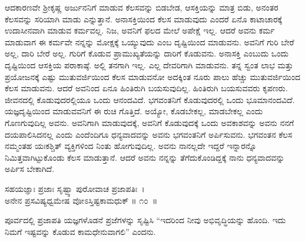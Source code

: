 ಆದಕಾರಣವೇ ಶ‍್ರೀಕೃಷ್ಣ ಅರ್ಜುನನಿಗೆ ಮಾಡುವ ಕೆಲಸವನ್ನು ಬಿಡಬೇಡ, ಆಸಕ್ತಿಯನ್ನು ಮಾತ್ರ ಬಿಡು, ಅನಂತರ ಕೆಲಸವನ್ನು ಸರಿಯಾಗಿ ಮಾಡು ಎನ್ನುತ್ತಾನೆ. ಅನಾಸಕ್ತಿಯಿಂದ ಕೆಲಸ ಮಾಡುವುದು ಎಂದರೆ ಏನೊ ಕಾಟಾಚಾರಕ್ಕೆ ಉದಾಸೀನವಾಗಿ ಮಾಡುವ ಕರ್ಮವಲ್ಲ. ನಿಜ, ಅವನಿಗೆ ಫಲದ ಮೇಲೆ ಅಪೇಕ್ಷೆ ಇಲ್ಲ. ಆದರೆ ಅವನು ಕರ್ಮ ಮಾಡುವಾಗ ಈ ಕರ್ಮವೇ ನನ್ನನ್ನು ಮೋಕ್ಷಕ್ಕೆ ಒಯ್ಯುವುದು ಎಂಬ ದೃಷ್ಟಿಯಿಂದ ಮಾಡುವನು. ಅವನಿಗೆ ಗುರಿ ಬೇರೆ ಅಲ್ಲ, ದಾರಿ ಬೇರೆ ಅಲ್ಲ. ಗುರಿಗೆ ಕೊಡುವ ಪ್ರಾಮುಖ್ಯತೆಯನ್ನು ದಾರಿಗೆ ಕೊಡುವನು. ಅನಾಸಕ್ತಿ ಎಂಬುದು ಒಂದು ದೃಷ್ಟಿಯಿಂದ ಆಸಕ್ತಿಯ ಪರಾಕಾಷ್ಠೆ. ಅಲ್ಲಿ ತನಗಾಗಿ ಇಲ್ಲ. ಎಲ್ಲ ದೇವರಿಗಾಗಿ ಮಾಡುವನು. ತನ್ನ ಸ್ವಂತ ಲಾಭ ಮತ್ತು ಪ್ರಯೋಜನಕ್ಕೆ ಎಷ್ಟು ಮುತುವರ್ಜಿಯಿಂದ ಕೆಲಸ ಮಾಡುವನೋ ಅದಕ್ಕಿಂತ ನೂರು ಪಾಲು ಹೆಚ್ಚು ಮುತುವರ್ಜಿಯಿಂದ ಕೆಲಸ ಮಾಡುವನು. ಆದರೆ ಅವನಿಂದ ಏನೂ ಹಿಂತಿರುಗಿ ಬಯಸುವುದಿಲ್ಲ. ಹಿಂತಿರುಗಿ ಬಯಸುವವರು ಕೃಪಣರು. ಜೀವನದಲ್ಲಿ ಕೊಡುವುದರಲ್ಲಿಯೂ ಒಂದು ಆನಂದವಿದೆ. ಭಗವಂತನಿಗೆ ಕೊಡುವುದರಲ್ಲಿ ಒಂದು ಭೂಮಾನಂದವಿದೆ. ಯಜ್ಞದೃಷ್ಟಿಯಿಂದ ಮಾಡುವವನಿಗೆ ಈ ರುಚಿ ಗೊತ್ತಿದೆ. ಅಯ್ಯೋ, ಕೊಡಬೇಕಲ್ಲ, ಮಾಡಬೇಕಲ್ಲ ಎಂದು ಗೊಣಗುವುದಿಲ್ಲ ಅವನು. ಅವನಿಗಾಗಿ ಮಾಡುವುದಕ್ಕೆ, ಅವನಿಗೆ ಕೊಡುವುದಕ್ಕೆ ಒಂದು ಅವಕಾಶವನ್ನು ಅವನು ನನಗೆ ದಯಪಾಲಿಸಿದನಲ್ಲ ಎಂದು ಎಂದೆಂದಿಗೂ ಧನ್ಯವಾದವನ್ನು ಅವನು ಭಗವಂತನಿಗೆ ಅರ್ಪಿಸುವನು. ಭಗವಂತನ ಕೆಲಸ ನಮ್ಮಂತಹ ಯಃಕಶ್ಚಿತ್ ವ್ಯಕ್ತಿಗಳಿಂದ ನಿಂತು ಹೋಗುವುದಿಲ್ಲ. ಅವನು ನಾನಲ್ಲದೇ ಇದ್ದರೆ ಇನ್ನಾರನ್ನೊ ನಿಮಿತ್ತವಾಗಿಟ್ಟುಕೊಂಡು ಕೆಲಸ ಮಾಡುತ್ತಾನೆ. ಆದರೆ ಅವನು ನನ್ನನ್ನು ತೆಗೆದುಕೊಂಡಿದ್ದಕ್ಕೆ ನಾನು ಧನ್ಯವಾದವನ್ನು ಅರ್ಪಿಸ ಬೇಕಾಗಿದೆ.

\begin{shloka}
ಸಹಯಜ್ಞಾಃ ಪ್ರಜಾಃ ಸೃಷ್ಟ್ವಾ ಪುರೋವಾಚ ಪ್ರಜಾಪತಿಃ~।\\ಅನೇನ ಪ್ರಸವಿಷ್ಯಧ್ವಮೇಷ ವೋಽಸ್ತಿಷ್ಟಕಾಮಧುಕ್ \hfill॥ ೧೦~॥
\end{shloka}

\begin{artha}
ಪೂರ್ವದಲ್ಲಿ ಪ್ರಜಾಪತಿ ಯಜ್ಞಗಳೊಡನೆ ಪ್ರಜೆಗಳನ್ನು ಸೃಷ್ಟಿಸಿ “ಇದರಿಂದ ನೀವು ಅಭಿವೃದ್ಧಿಯನ್ನು ಹೊಂದಿ. ಇದು ನಿಮಗೆ ಇಷ್ಟವನ್ನು ಕೊಡುವ ಕಾಮಧೇನುವಾಗಲಿ” ಎಂದನು.
\end{artha}

